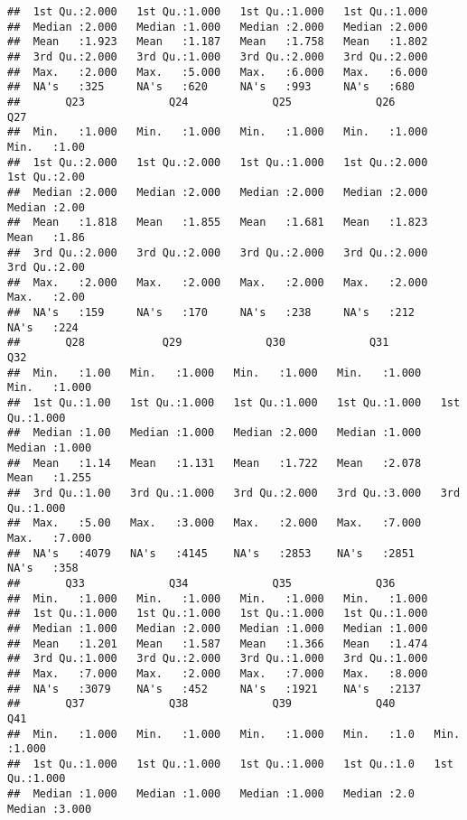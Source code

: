 \documentclass[
]{article}
\begin{document}
\begin{verbatim}
##  1st Qu.:2.000   1st Qu.:1.000   1st Qu.:1.000   1st Qu.:1.000  
##  Median :2.000   Median :1.000   Median :2.000   Median :2.000  
##  Mean   :1.923   Mean   :1.187   Mean   :1.758   Mean   :1.802  
##  3rd Qu.:2.000   3rd Qu.:1.000   3rd Qu.:2.000   3rd Qu.:2.000  
##  Max.   :2.000   Max.   :5.000   Max.   :6.000   Max.   :6.000  
##  NA's   :325     NA's   :620     NA's   :993     NA's   :680    
##       Q23             Q24             Q25             Q26             Q27      
##  Min.   :1.000   Min.   :1.000   Min.   :1.000   Min.   :1.000   Min.   :1.00  
##  1st Qu.:2.000   1st Qu.:2.000   1st Qu.:1.000   1st Qu.:2.000   1st Qu.:2.00  
##  Median :2.000   Median :2.000   Median :2.000   Median :2.000   Median :2.00  
##  Mean   :1.818   Mean   :1.855   Mean   :1.681   Mean   :1.823   Mean   :1.86  
##  3rd Qu.:2.000   3rd Qu.:2.000   3rd Qu.:2.000   3rd Qu.:2.000   3rd Qu.:2.00  
##  Max.   :2.000   Max.   :2.000   Max.   :2.000   Max.   :2.000   Max.   :2.00  
##  NA's   :159     NA's   :170     NA's   :238     NA's   :212     NA's   :224   
##       Q28            Q29             Q30             Q31             Q32       
##  Min.   :1.00   Min.   :1.000   Min.   :1.000   Min.   :1.000   Min.   :1.000  
##  1st Qu.:1.00   1st Qu.:1.000   1st Qu.:1.000   1st Qu.:1.000   1st Qu.:1.000  
##  Median :1.00   Median :1.000   Median :2.000   Median :1.000   Median :1.000  
##  Mean   :1.14   Mean   :1.131   Mean   :1.722   Mean   :2.078   Mean   :1.255  
##  3rd Qu.:1.00   3rd Qu.:1.000   3rd Qu.:2.000   3rd Qu.:3.000   3rd Qu.:1.000  
##  Max.   :5.00   Max.   :3.000   Max.   :2.000   Max.   :7.000   Max.   :7.000  
##  NA's   :4079   NA's   :4145    NA's   :2853    NA's   :2851    NA's   :358    
##       Q33             Q34             Q35             Q36       
##  Min.   :1.000   Min.   :1.000   Min.   :1.000   Min.   :1.000  
##  1st Qu.:1.000   1st Qu.:1.000   1st Qu.:1.000   1st Qu.:1.000  
##  Median :1.000   Median :2.000   Median :1.000   Median :1.000  
##  Mean   :1.201   Mean   :1.587   Mean   :1.366   Mean   :1.474  
##  3rd Qu.:1.000   3rd Qu.:2.000   3rd Qu.:1.000   3rd Qu.:1.000  
##  Max.   :7.000   Max.   :2.000   Max.   :7.000   Max.   :8.000  
##  NA's   :3079    NA's   :452     NA's   :1921    NA's   :2137   
##       Q37             Q38             Q39             Q40           Q41       
##  Min.   :1.000   Min.   :1.000   Min.   :1.000   Min.   :1.0   Min.   :1.000  
##  1st Qu.:1.000   1st Qu.:1.000   1st Qu.:1.000   1st Qu.:1.0   1st Qu.:1.000  
##  Median :1.000   Median :1.000   Median :1.000   Median :2.0   Median :3.000  

\end{verbatim}
\end{document}
